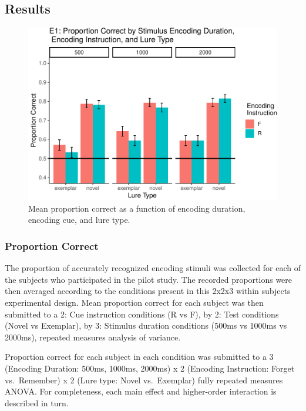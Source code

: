 \documentclass[
  man,floatsintext]{apa6}
\begin{document}
\hypertarget{results}{%
\subsection{Results}\label{results}}

\begin{figure}
\centering
\includegraphics{honorsThesis_NEW_files/figure-latex/e1fig-1.pdf}
\caption{\label{fig:e1fig}Mean proportion correct as a function of encoding duration, encoding cue, and lure type.}
\end{figure}

\hypertarget{proportion-correct}{%
\subsubsection{Proportion Correct}\label{proportion-correct}}

The proportion of accurately recognized encoding stimuli was collected for each of the subjects who participated in the pilot study. The recorded proportions were then averaged according to the conditions present in this 2x2x3 within subjects experimental design. Mean proportion correct for each subject was then submitted to a 2: Cue instruction conditions (R vs F), by 2: Test conditions (Novel vs Exemplar), by 3: Stimulus duration conditions (500ms vs 1000ms vs 2000ms), repeated measures analysis of variance.

Proportion correct for each subject in each condition was submitted to a 3 (Encoding Duration: 500ms, 1000ms, 2000ms) x 2 (Encoding Instruction: Forget vs.~Remember) x 2 (Lure type: Novel vs.~Exemplar) fully repeated measures ANOVA. For completeness, each main effect and higher-order interaction is described in turn.
\end{document}
